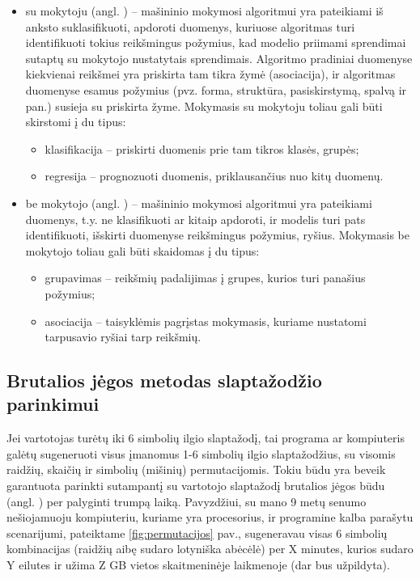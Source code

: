 \documentclass{VUMIFInfBakalaurinis}
\begin{document}
\begin{itemize}
  \item su mokytoju (angl. ) -- mašininio 
    mokymosi algoritmui yra pateikiami iš anksto suklasifikuoti, apdoroti 
    duomenys, kuriuose algoritmas turi identifikuoti tokius reikšmingus 
    požymius, kad modelio priimami sprendimai sutaptų su mokytojo nustatytais 
    sprendimais.
    Algoritmo pradiniai duomenyse kiekvienai reikšmei yra priskirta tam tikra 
    žymė (asociacija), ir algoritmas duomenyse esamus požymius (pvz. forma, 
    struktūra, pasiskirstymą, spalvą ir pan.) susieja su priskirta žyme. 
    Mokymasis su mokytoju toliau gali būti skirstomi į du tipus:
    \begin{itemize}
      \item klasifikacija -- priskirti duomenis prie tam tikros klasės, grupės;
      \item regresija -- prognozuoti duomenis, priklausančius nuo kitų duomenų.
    \end{itemize}
  \item be mokytojo (angl. ) -- mašininio 
    mokymosi algoritmui yra pateikiami  duomenys, t.y. ne 
    klasifikuoti ar kitaip apdoroti, ir modelis turi pats identifikuoti, 
    išskirti duomenyse reikšmingus požymius, ryšius. Mokymasis be mokytojo 
    toliau gali būti skaidomas į du tipus:
    \begin{itemize}
      \item grupavimas -- reikšmių padalijimas į grupes, kurios turi panašius 
        požymius;
      \item asociacija -- taisyklėmis pagrįstas mokymasis, kuriame nustatomi 
        tarpusavio ryšiai tarp reikšmių.
    \end{itemize}
\end{itemize}

\subsection{Brutalios jėgos metodas slaptažodžio parinkimui} 
\label{sec:bruteforce}
Jei vartotojas turėtų iki 6 simbolių ilgio slaptažodį, tai programa ar 
kompiuteris galėtų sugeneruoti visus įmanomus 1-6 simbolių ilgio slaptažodžius, 
su visomis raidžių, skaičių ir simbolių (mišinių) permutacijomis. Tokiu būdu yra 
beveik garantuota parinkti sutampantį su vartotojo slaptažodį brutalios jėgos 
būdu (angl. ) per palyginti trumpą laiką.
Pavyzdžiui, su mano 9 metų senumo nešiojamuoju kompiuteriu, kuriame yra 
 procesorius, ir  programine kalba 
parašytu scenarijumi, pateiktame \ref{fig:permutacijos} pav., sugeneravau visas 
6 simbolių kombinacijas (raidžių aibę sudaro lotyniška abėcėlė) per X minutes, 
kurios sudaro Y eilutes ir užima Z GB vietos skaitmeninėje laikmenoje (dar bus 
užpildyta).
\end{document}
